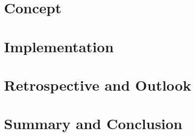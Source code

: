 \documentclass{clbthesis}
\begin{document}
\chapter{Concept}							


\chapter{Implementation}						


\chapter{Retrospective and Outlook} 			


\chapter{Summary and Conclusion}				




\cleardoublepage
{}
{}\listoffigures

\listoftables

\glsaddall
\printglossaries

\appendix

% 
\end{document}
